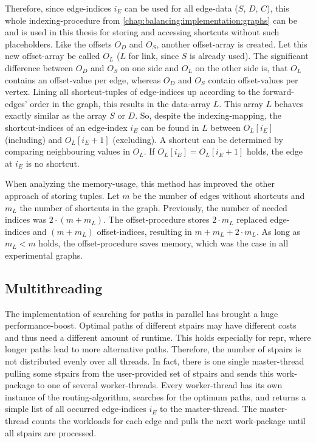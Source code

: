         Therefore, since edge-indices $i_E$ can be used for all edge-data ($S$, $D$, $C$), this whole indexing-procedure from \cref{chap:balancing:implementation:graphs} can be and is used in this thesis for storing and accessing shortcuts without such placeholders.
        Like the offsets $O_D$ and $O_S$, another offset-array is created.
        Let this new offset-array be called $O_L$ ($L$ for link, since $S$ is already used).
        The significant difference between $O_D$ and $O_S$ on one side and $O_L$ on the other side is, that $O_L$ contains an offset-value per edge, whereas $O_D$ and $O_S$ contain offset-values per vertex.
        Lining all shortcut-tuples of edge-indices up according to the forward-edges' order in the graph, this results in the data-array $L$.
        This array $L$ behaves exactly similar as the array $S$ or $D$.
        So, despite the indexing-mapping, the shortcut-indices of an edge-index $i_E$ can be found in $L$ between $O_L \left[ i_E \right]$ (including) and $O_L \left[ i_E + 1 \right]$ (excluding).
        A shortcut can be determined by comparing neighbouring values in $O_L$.
        If $O_L \left[ i_E \right] = O_L \left[ i_E + 1 \right]$ holds, the edge at $i_E$ is no shortcut.

        When analyzing the memory-usage, this method has improved the other approach of storing tuples.
        Let $m$ be the number of edges without shortcuts and $m_L$ the number of shortcuts in the graph.
        Previously, the number of needed indices was $2 \cdot (m + m_L)$.
        The offset-procedure stores $2 \cdot m_L$ replaced edge-indices and $(m + m_L)$ offset-indices, resulting in $m + m_L + 2 \cdot m_L$.
        As long as $m_L < m$ holds, the offset-procedure saves memory, which was the case in all experimental graphs.

    \subsection{Multithreading}

        The implementation of searching for paths in parallel has brought a huge performance-boost.
        Optimal paths of different \glspl{stpair} may have different costs and thus need a different amount of runtime.
        This holds especially for \gls{repr}, where longer paths lead to more alternative paths.
        Therefore, the number of \glspl{stpair} is not distributed evenly over all threads.
        In fact, there is one single master-thread pulling some \glspl{stpair} from the user-provided set of \glspl{stpair} and sends this work-package to one of several worker-threads.
        Every worker-thread has its own instance of the routing-algorithm, searches for the optimum paths, and returns a simple list of all occurred edge-indices $i_E$ to the master-thread.
        The master-thread counts the workloads for each edge and pulls the next work-package until all \glspl{stpair} are processed.

